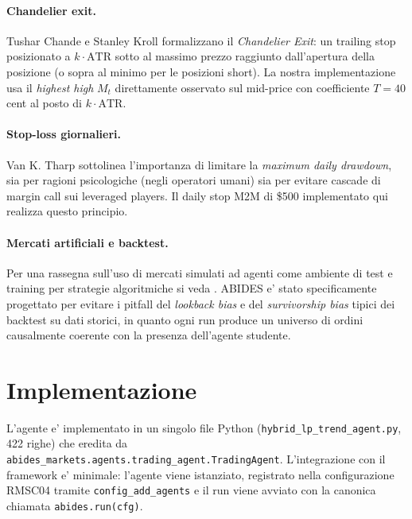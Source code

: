 \documentclass[11pt,a4paper]{article}
\begin{document}
\paragraph{Chandelier exit.}
Tushar Chande e Stanley Kroll \cite{chande1994new} formalizzano il
\emph{Chandelier Exit}: un trailing stop posizionato a $k \cdot \text{ATR}$
sotto al massimo prezzo raggiunto dall'apertura della posizione (o
sopra al minimo per le posizioni short).  La nostra
implementazione usa il \emph{highest high} $M_t$ direttamente
osservato sul mid-price con coefficiente $T = 40$ cent al posto di
$k \cdot \text{ATR}$.

\paragraph{Stop-loss giornalieri.}
Van K. Tharp \cite{tharp1998trade} sottolinea l'importanza di
limitare la \emph{maximum daily drawdown}, sia per ragioni
psicologiche (negli operatori umani) sia per evitare cascade di
margin call sui leveraged players.  Il daily stop M2M di \$500
implementato qui realizza questo principio.

\paragraph{Mercati artificiali e backtest.}
Per una rassegna sull'uso di mercati simulati ad agenti come
ambiente di test e training per strategie algoritmiche si veda
\cite{byrd2020abides}.  ABIDES e' stato specificamente progettato
per evitare i pitfall del \emph{lookback bias} e del
\emph{survivorship bias} tipici dei backtest su dati storici, in
quanto ogni run produce un universo di ordini causalmente coerente
con la presenza dell'agente studente.

\section{Implementazione}
\label{sec:impl}

L'agente e' implementato in un singolo file Python
(\texttt{hybrid\_lp\_trend\_agent.py}, 422 righe) che eredita da
\texttt{abides\_markets.agents.trading\_agent.TradingAgent}.
L'integrazione con il framework e' minimale: l'agente viene
istanziato, registrato nella configurazione RMSC04 tramite
\texttt{config\_add\_agents} e il run viene avviato con la
canonica chiamata \texttt{abides.run(cfg)}.
\end{document}
